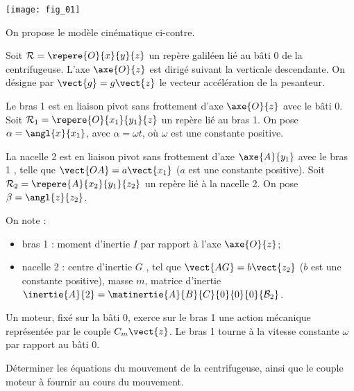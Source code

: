 \begin{marginfigure}
\texttt{[image: fig\_01]}
\end{marginfigure}

On propose le modèle cinématique ci-contre.


Soit $\mathcal{R}=\repere{O}{x}{y}{z}$ un repère galiléen lié au bâti 0 de la centrifugeuse. L'axe $\axe{O}{z}$ est dirigé suivant la verticale descendante. 
On désigne par $\vect{g}=g\vect{z}$ le vecteur accélération de la pesanteur.

Le bras 1 est en liaison pivot sans frottement d’axe $\axe{O}{z}$ avec le bâti 0. Soit $\mathcal{R}_1=\repere{O}{x_1}{y_1}{z}$ un repère lié au bras 1. On pose $\alpha=\angl{x}{x_1}$, avec $\alpha=\omega t$, où $\omega$ est une constante positive. 

La nacelle 2 est en liaison pivot sans frottement d’axe $\axe{A}{y_1}$ avec le bras 1 , telle que $\vect{OA}=a\vect{x_1}$ ($a$ est une constante positive). Soit $\mathcal{R}_2=\repere{A}{x_2}{y_1}{z_2}$ un repère lié à la nacelle 2. On pose $\beta=\angl{z}{z_2}$. 

On note :
\begin{itemize}
\item bras 1 : moment d’inertie $I$ par rapport à l’axe $\axe{O}{z}$;
\item nacelle 2 : centre d’inertie $G$ , tel que $\vect{AG}=b\vect{z_2}$ ($b$ est une constante positive), masse $m$, 
matrice d’inertie $\inertie{A}{2}=\matinertie{A}{B}{C}{0}{0}{0}{\mathcal{B}_2}$. 
\end{itemize}
Un moteur, fixé sur la bâti 0, exerce sur le bras 1 une action mécanique représentée par le couple $C_m\vect{z}$.
Le bras 1 tourne à la vitesse constante $\omega$ par rapport au bâti 0.

\begin{obj}
Déterminer les équations du mouvement de la centrifugeuse, ainsi que le couple moteur à fournir au cours du
mouvement.
\end{obj}

\ifprof
\begin{corrige}
\end{corrige}
\else
\fi

\ifprof
\begin{corrige}
\end{corrige}
\else
\fi

